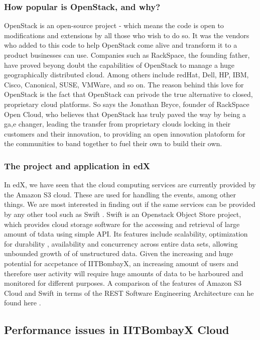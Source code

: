 \documentclass[14pt]{article}
\begin{document}
\subsubsection{How popular is OpenStack, and why?}

OpenStack is an open-source project - which means the code is open to modifications and extensions by all those who wish to do so. It was the vendors who added to this code to help OpenStack come alive and transform it to a product businesses can use. Companies such as RackSpace, the founding father, have proved beyong doubt the capabilities of OpenStack to manage a huge geographically distributed cloud. Among others include redHat, Dell, HP, IBM, Cisco, Canonical, SUSE, VMWare, and so on. The reason behind this love for OpenStack is the fact that OpenStack can privode the true alternative to closed, proprietary cloud platforms. So says the Jonathan Bryce, founder of RackSpace Open Cloud, who believes that OpenStack has truly paved the way by being a ga,e changer, leading the transfer from proprietary clouds locking in their customers and their innovation, to providing an open innovation platoform for the communities to band together to fuel their own to build their own. \cite{JBopenstack}

\subsubsection{The project and application in edX}

In edX, we have seen that the cloud computing services are currently provided by the Amazon S3 cloud. These are used for handling the events, among other things. We are most interested in finding out if the same services can be provided by any other tool such as Swift \cite{Swift}. Swift is an Openstack Object Store project, which provides cloud storage software for the accessing and retrieval of large amount of tdata using simple API. Its features include scalability, optimization for durability , availability and concurrency across entire data sets, allowing unbounded growth of of unstructured data. Given the increasing and huge potential for accpetance of IITBombayX, an increasing amount of users and therefore user activity will require huge amounts of data to be harboured and monitored for different purposes. A comparison of the features of Amazon S3 Cloud and Swift in terms of the REST Software Engineering Architecture can he found here \cite{SwiftAPIcomp}.

\subsection{Performance issues in IITBombayX Cloud}
\end{document}
